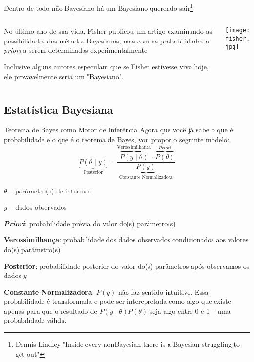 \begin{frame}{Dentro de todo não Bayesiano há um Bayesiano querendo sair\footnote{Dennis Lindley "Inside every nonBayesian there is a Bayesian struggling to get out"}}
	\begin{columns}
		\begin{column}{0.8\textwidth}
			\begin{vfilleditems}
				\item No último ano de sua vida, Fisher publicou um artigo \parencite{fisherExamplesBayesMethod1962} examinando as possibilidades dos métodos Bayesianos, mas com as probabilidades a \textit{priori} a serem determinadas experimentalmente.
				\item Inclusive alguns autores especulam \parencite{jaynesProbabilityTheoryLogic2003} que se Fisher estivesse vivo hoje, ele provavelmente seria um "Bayesiano".
			\end{vfilleditems}
		\end{column}
		\begin{column}{0.2\textwidth}
			\centering
			\texttt{[image: fisher.jpg]}
		\end{column}
	\end{columns}
\end{frame}

\subsection{Estatística Bayesiana}
\begin{frame}{Teorema de Bayes como Motor de Inferência}
	\footnotesize Agora que você já sabe o que é probabilidade e o que é o teorema de Bayes, vou propor o seguinte modelo:
	$$
		\underbrace{P(\theta \mid y)}_{\text{Posterior}} = \frac{\overbrace{P(y \mid  \theta)}^{\text{Verossimilhança}} \cdot \overbrace{P(\theta)}^{\textit{Priori}}}{\underbrace{P(y)}_{\text{Constante Normalizadora}}}
	$$
	\begin{vfilleditems}
		\item \footnotesize $\theta$ -- parâmetro(s) de interesse
		\item \footnotesize $y$ -- dados observados
		\item \footnotesize \textbf{\textit{Priori}}: probabilidade prévia do valor do(s) parâmetro(s)
		\item \footnotesize \textbf{Verossimilhança}: probabilidade dos dados observados condicionados aos valores do(s) parâmetro(s)
		\item \footnotesize \textbf{Posterior}: probabilidade posterior do valor do(s) parâmetros após observamos os dados $y$
		\item \footnotesize \textbf{Constante Normalizadora}: $P(y)$ não faz sentido intuitivo. Essa probabilidade é transformada e pode ser interepretada como algo que existe apenas para que o resultado de $P(y \mid \theta) P(\theta)$ seja algo entre 0 e 1 -- uma probabilidade válida.
	\end{vfilleditems}
\end{frame}

